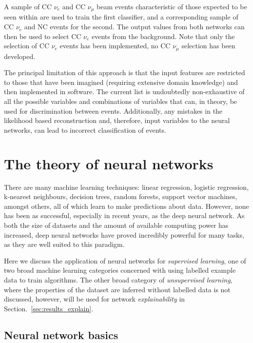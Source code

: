 A sample of CC $\nu_{e}$ and CC $\nu_{\mu}$ beam events characteristic of those expected to be
seen within \chipsfive are used to train the first classifier, and a corresponding sample of CC
$\nu_{e}$ and NC events for the second. The output values from both networks can then be used to
select CC $\nu_{e}$ events from the background. Note that only the selection of CC $\nu_{e}$
events has been implemented, no CC $\nu_{\mu}$ selection has been developed.

The principal limitation of this approach is that the input features are restricted to those that
have been imagined (requiring extensive domain knowledge) and then implemented in software. The
current list is undoubtedly non-exhaustive of all the possible variables and combinations of
variables that can, in theory, be used for discrimination between events. Additionally, any
mistakes in the likelihood based reconstruction and, therefore, input variables to the neural
networks, can lead to incorrect classification of events.

\section{The theory of neural networks} %
\label{sec:cnn_theory} %

There are many machine learning techniques: linear regression, logistic regression, k-nearest
neighbours, decision trees, random forests, support vector machines, amongst others, all of which
learn to make predictions about data. However, none has been as successful, especially in recent
years, as the deep neural network. As both the size of datasets and the amount of available
computing power has increased, deep neural networks have proved incredibly powerful for many
tasks, as they are well suited to this paradigm.

Here we discuss the application of neural networks for \emph{supervised learning}, one of two
broad machine learning categories concerned with using labelled example data to train algorithms.
The other broad category of \emph{unsupervised learning}, where the properties of the dataset are
inferred without labelled data is not discussed, however, will be used for network
\emph{explainability} in Section.~\ref{sec:results_explain}.

\subsection{Neural network basics} %
\label{sec:cnn_theory_basics} %

